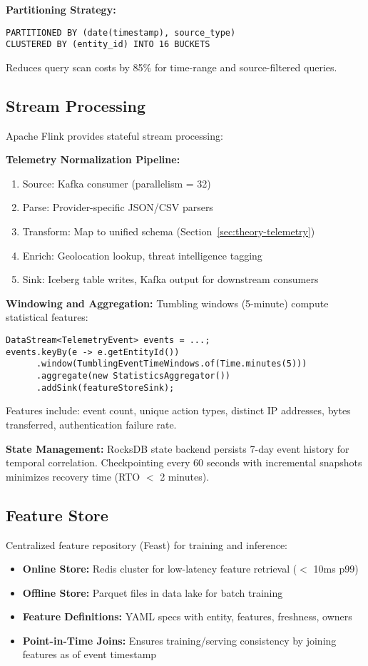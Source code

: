 \textbf{Partitioning Strategy:}
\begin{verbatim}
PARTITIONED BY (date(timestamp), source_type)
CLUSTERED BY (entity_id) INTO 16 BUCKETS
\end{verbatim}
Reduces query scan costs by 85\% for time-range and source-filtered queries.

\subsection{Stream Processing}
Apache Flink provides stateful stream processing:

\textbf{Telemetry Normalization Pipeline:}
\begin{enumerate}
    \item Source: Kafka consumer (parallelism = 32)
    \item Parse: Provider-specific JSON/CSV parsers
    \item Transform: Map to unified schema (Section~\ref{sec:theory-telemetry})
    \item Enrich: Geolocation lookup, threat intelligence tagging
    \item Sink: Iceberg table writes, Kafka output for downstream consumers
\end{enumerate}

\textbf{Windowing and Aggregation:}
Tumbling windows (5-minute) compute statistical features:
\begin{verbatim}
DataStream<TelemetryEvent> events = ...;
events.keyBy(e -> e.getEntityId())
      .window(TumblingEventTimeWindows.of(Time.minutes(5)))
      .aggregate(new StatisticsAggregator())
      .addSink(featureStoreSink);
\end{verbatim}

Features include: event count, unique action types, distinct IP addresses, bytes transferred, authentication failure rate.

\textbf{State Management:}
RocksDB state backend persists 7-day event history for temporal correlation. Checkpointing every 60 seconds with incremental snapshots minimizes recovery time (RTO $<$ 2 minutes).

\subsection{Feature Store}
Centralized feature repository (Feast) for training and inference:
\begin{itemize}
    \item \textbf{Online Store:} Redis cluster for low-latency feature retrieval ($<$ 10ms p99)
    \item \textbf{Offline Store:} Parquet files in data lake for batch training
    \item \textbf{Feature Definitions:} YAML specs with entity, features, freshness, owners
    \item \textbf{Point-in-Time Joins:} Ensures training/serving consistency by joining features as of event timestamp
\end{itemize}

